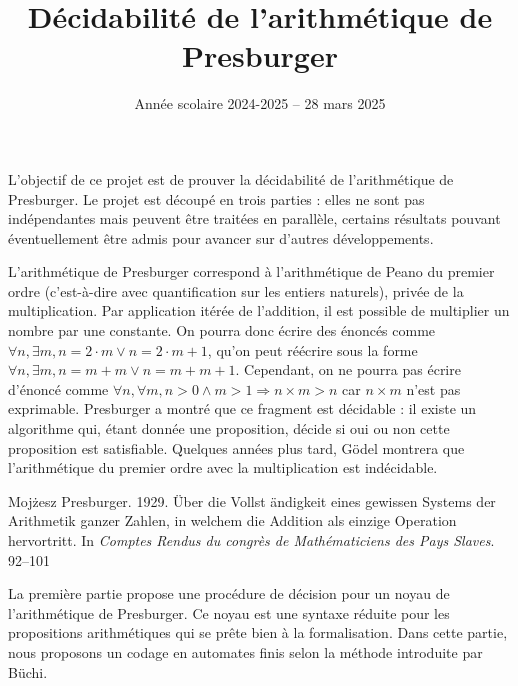 \documentclass{article}
\begin{document}
\title{Décidabilité de l'arithmétique de Presburger}
\date{Année scolaire 2024-2025 -- 28 mars 2025}

\maketitle

L'objectif de ce projet est de prouver la décidabilité de
l'arithmétique de Presburger.  Le projet est découpé en trois parties
: elles ne sont pas indépendantes mais peuvent être traitées en
parallèle, certains résultats pouvant éventuellement être admis pour
avancer sur d'autres développements.

L'arithmétique de Presburger correspond à l'arithmétique de Peano du
premier ordre (c'est-à-dire avec quantification sur les entiers
naturels), privée de la multiplication. Par application itérée de
l'addition, il est possible de multiplier un nombre par une constante.
On pourra donc écrire des énoncés comme
\(\forall n, \exists m, n = 2 \cdot m \vee n = 2 \cdot m + 1 \), qu'on
peut réécrire sous la forme
\(\forall n, \exists m, n = m + m \vee n = m + m + 1 \).  Cependant,
on ne pourra pas écrire d'énoncé comme
\(\forall n, \forall m, n > 0 \wedge m > 1 \Rightarrow n \times m >
n\) car \(n \times m\) n'est pas exprimable.  Presburger a montré que
ce fragment est décidable : il existe un algorithme qui, étant donnée
une proposition, décide si oui ou non cette proposition est
satisfiable. Quelques années plus tard, Gödel montrera que
l'arithmétique du premier ordre avec la multiplication est
indécidable.

\vspace{0.5em}

Mojżesz Presburger. 1929. Über die Vollst ändigkeit eines gewissen Systems der Arithmetik ganzer Zahlen,
in welchem die Addition als einzige Operation hervortritt. In \emph{Comptes Rendus du congrès de Mathématiciens des Pays Slaves}. 92–101

\vspace{0.5em}

La première partie propose une procédure de décision pour un noyau de
l'arithmétique de Presburger.  Ce noyau est une syntaxe réduite pour
les propositions arithmétiques qui se prête bien à la formalisation.
Dans cette partie, nous proposons un codage en automates finis selon
la méthode introduite par Büchi.

\vspace{0.5em}

\end{document}
